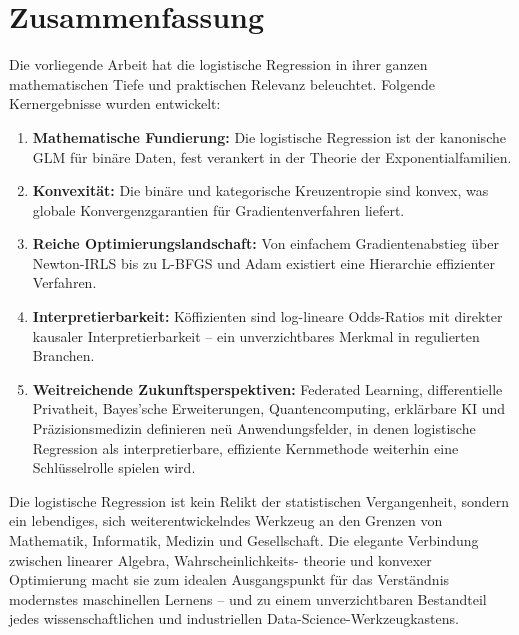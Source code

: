 ﻿\documentclass[12pt, a4paper]{article}
\theoremstyle{definition}
\theoremstyle{remark}
\begin{document}
\section{Zusammenfassung}

Die vorliegende Arbeit hat die logistische Regression in ihrer ganzen mathematischen Tiefe
und praktischen Relevanz beleuchtet. Folgende Kernergebnisse wurden entwickelt:

\begin{enumerate}[label=(\roman*)]
  \item \textbf{Mathematische Fundierung:} Die logistische Regression ist der kanonische
    GLM für binäre Daten, fest verankert in der Theorie der Exponentialfamilien.
  \item \textbf{Konvexität:} Die binäre und kategorische Kreuzentropie sind konvex,
    was globale Konvergenzgarantien für Gradientenverfahren liefert.
  \item \textbf{Reiche Optimierungslandschaft:} Von einfachem Gradientenabstieg über
    Newton-IRLS bis zu L-BFGS und Adam existiert eine Hierarchie effizienter Verfahren.
  \item \textbf{Interpretierbarkeit:} Köffizienten sind log-lineare Odds-Ratios mit
    direkter kausaler Interpretierbarkeit -- ein unverzichtbares Merkmal in regulierten Branchen.
  \item \textbf{Weitreichende Zukunftsperspektiven:} Federated Learning, differentielle
    Privatheit, Bayes'sche Erweiterungen, Quantencomputing, erklärbare KI und Präzisionsmedizin
    definieren neü Anwendungsfelder, in denen logistische Regression als interpretierbare,
    effiziente Kernmethode weiterhin eine Schlüsselrolle spielen wird.
\end{enumerate}

Die logistische Regression ist kein Relikt der statistischen Vergangenheit, sondern ein
lebendiges, sich weiterentwickelndes Werkzeug an den Grenzen von Mathematik, Informatik,
Medizin und Gesellschaft. Die elegante Verbindung zwischen linearer Algebra, Wahrscheinlichkeits-
theorie und konvexer Optimierung macht sie zum idealen Ausgangspunkt für das Verständnis
modernstes maschinellen Lernens -- und zu einem unverzichtbaren Bestandteil jedes
wissenschaftlichen und industriellen Data-Science-Werkzeugkastens.
\end{document}
